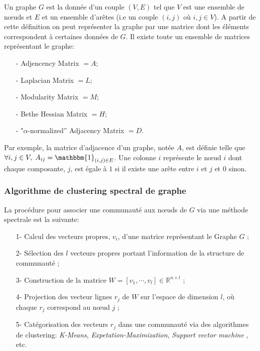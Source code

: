 Un graphe $G$ est la donnée d'un couple $(V, E)$ tel que $V$ est une ensemble de nœuds et $E$ et un ensemble d'arêtes (i.e un couple $(i,j)$ où $i,j \in V$).
A partir de cette définition on peut représenter la graphe par une matrice dont les éléments correspondent à certaines données de $G$.
Il existe toute un ensemble de matrices représentant le graphe:
\begin{itemize}
  	\item[-]  Adjencency Matrix $= A$;
  	\item[-]  Laplacian Matrix $= L$;
  	\item[-]  Modularity Matrix $= M$;
  	\item[-]  Bethe Hessian Matrix $= H$;
  	\item[-]  "$\alpha$-normalized” Adjacency Matrix $= D$.\\
\end{itemize}
Par exemple, la matrice d'adjacence d'un graphe, notée $A$, est définie telle que $\forall i,j \in V, \; A_{ij} = \mathbbm{1}_{(i,j) \in E}$.
Une colonne $i$ représente le nœud $i$ dont chaque composante, $j$, est égale à $1$ si il existe une arête entre $i$ et $j$ et $0$ sinon.\\

\subsubsection*{Algorithme de clustering spectral de graphe}
La procédure pour associer une communauté aux nœuds de $G$ via une méthode spectrale est la suivante: 
\begin{itemize}
	\item[1-] Calcul des vecteurs propres, $v_i$, d'une matrice représentant le Graphe $G$ ;
	\item[2-] Sélection des $l$ vecteurs propres portant l'information de la structure de communauté ; 
	\item[3-] Construction de la matrice $W = [v_1, \cdots, v_l] \in \mathbb{R}^{n\times l}$ ; 
	\item[4-] Projection des vecteur lignes $r_j$ de $W$ sur l'espace de dimension $l$, où chaque $r_j$ correspond  au nœud $j$ ; 
	\item[5-] Catégorisation des vecteurs $r_j $ dans une communauté via des algorithmes de clustering: \textit{K-Means}, \textit{Expetation-Maximization}, \textit{Support vector machine }, etc.\\
\end{itemize}

